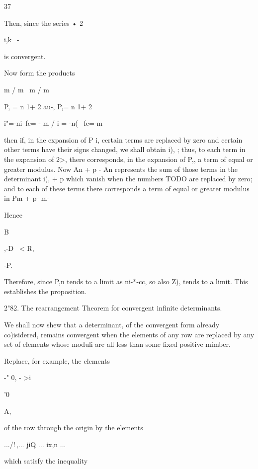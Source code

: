 37




Then, since the series • 2

i,k=-



is convergent.

Now form the products

m / m \ m / m

P, = n 1+ 2 au-, P,= n 1+ 2

i"=-ni\ fc= - m / i = -n( \ fc=-m

then if, in the expansion of P i, certain terms are replaced by zero
and certain other terms have their signs changed, we shall obtain i),
; thus, to each term in the expansion of 2>, there corresponds, in
the expansion of P,, a term of equal or greater modulus. Now An + p -
An represents the sum of those terms in the determinant i), + p which
vanish when the numbers TODO are replaced by zero; and to each of
these terms there corresponds a term of equal or greater modulus in Pm
+ p- m-



Hence



B



,-D \ < R,



-P.



Therefore, since P,n tends to a limit as ni-*-cc, so also Z), tends
to a limit. This establishes the proposition.

2"82. The rearrangement Theorem for convergent infinite determinants.

We shall now shew that a determinant, of the convergent form already
co)isidered, remains convergent when the elements of any row are
replaced by any set of elements whose moduli are all less than some
fixed positive mimber.

Replace, for example, the elements



-" 0, - >i



'0



A,



of the row through the origin by the elements

.../!\,,... jiQ ... ix,n ...

which satisfy the inequality

